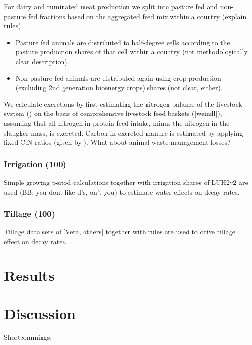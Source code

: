 \documentclass[gc, manuscript]{copernicus}
\begin{document}
For dairy and ruminated meat production we split into pasture fed and
non-pasture fed fractions based on the aggregated feed mix within a
country (explain rules)

\begin{itemize}
\item
  Pasture fed animals are distributed to half-degree cells according to
  the pasture production shares of that cell within a country (not
  methodologically clear description).
\item
  Non-pasture fed animals are distributed again using crop production
  (excluding 2nd generation bioenergy crops) shares (not clear, either).
\end{itemize}

We calculate excretions by first estimating the nitrogen balance of the
livestock system (\citep{bodirsky1012}) on the basis of comprehensive
livestock feed baskets ({[}weindl{]}), assuming that all nitrogen in
protein feed intake, minus the nitrogen in the slaugher mass, is
excreted. Carbon in excreted manure is estimated by applying fixed C:N
ratios (given by \citep[(][]{ipcc_2019_2019}). What about animal waste
management losses?

\subsubsection{Irrigation (100)}

Simple growing period calculations together with irrigation shares of
LUH2v2 are used (BB: you dont like d's, on't you) to estimate water
effects on decay rates.

\subsubsection{Tillage (100)}

Tillage data sets of {[}Vera, others{]} together with rules are used to
drive tillage effect on decay rates. \newpage

\section{Results}

\newpage

\section{Discussion}

Shortcommings:
\end{document}
